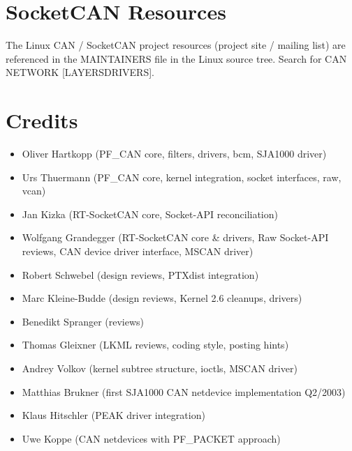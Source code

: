 \documentclass[a4paper,8pt,english]{sphinxmanual}
\begin{document}
\section{SocketCAN Resources}
\label{networking/can:socketcan-resources}\label{networking/can:id6}
The Linux CAN / SocketCAN project resources (project site / mailing list)
are referenced in the MAINTAINERS file in the Linux source tree.
Search for CAN NETWORK {[}LAYERS\textbar{}DRIVERS{]}.


\section{Credits}
\label{networking/can:credits}\begin{itemize}
\item {} 
Oliver Hartkopp (PF\_CAN core, filters, drivers, bcm, SJA1000 driver)

\item {} 
Urs Thuermann (PF\_CAN core, kernel integration, socket interfaces, raw, vcan)

\item {} 
Jan Kizka (RT-SocketCAN core, Socket-API reconciliation)

\item {} 
Wolfgang Grandegger (RT-SocketCAN core \& drivers, Raw Socket-API reviews, CAN device driver interface, MSCAN driver)

\item {} 
Robert Schwebel (design reviews, PTXdist integration)

\item {} 
Marc Kleine-Budde (design reviews, Kernel 2.6 cleanups, drivers)

\item {} 
Benedikt Spranger (reviews)

\item {} 
Thomas Gleixner (LKML reviews, coding style, posting hints)

\item {} 
Andrey Volkov (kernel subtree structure, ioctls, MSCAN driver)

\item {} 
Matthias Brukner (first SJA1000 CAN netdevice implementation Q2/2003)

\item {} 
Klaus Hitschler (PEAK driver integration)

\item {} 
Uwe Koppe (CAN netdevices with PF\_PACKET approach)


\end{itemize}
\end{document}
